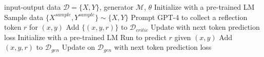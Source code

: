 \begin{algorithm}
\caption{\model Training}\label{alg:self_reward training}
\begin{algorithmic}[1]
 input-output data $\mathcal{D} = \{X, Y\}$, generator $\mathcal{M}$, \mcrt $\theta$
\State Initialize \mcrt with a pre-trained LM
\State Sample data $\{X^{sample}, Y^{sample}\} \sim \{X, Y\}$ 
 \Comment{\textcolor{blue}{Data collections for \mcrt} }
\State Prompt GPT-4 to collect a reflection token $r$ for $(x,y)$ 
\State Add $\{(x, y, r)\}$ to $\mathcal{D}_{critic}$ 
\EndFor
\State Update \mcrt with next token prediction loss 
\State Initialize \mgen with a pre-trained LM 
 
\State Run \mcrt to predict $r$ given $(x, y)$
\State Add $(x, y, r)$ to $\mathcal{D}_{gen}$ 
\EndFor
\State Update \mgen on $\mathcal{D}_{gen}$ with next token prediction loss 
\end{algorithmic}
\end{algorithm}


